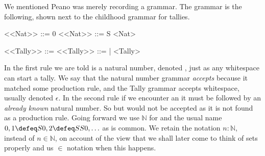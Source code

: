 \index{\code{::=}}
We mentioned Peano was merely recording a grammar.  
The grammar is the following, shown next to the childhood grammar for tallies.
\begin{center}
\begin{minipage}{0.4\textwidth}
\begin{Gcode}[]
<<Nat>> ::= 0 
<<Nat>> ::= S <Nat>
\end{Gcode}
\end{minipage}
\hfill
\begin{minipage}{0.45\textwidth}
\begin{Gcode}[]
<<Tally>> ::=  
<<Tally>> ::= | <Tally>
\end{Gcode}
\end{minipage}
\end{center}
In the first rule we are told  is a natural number, denoted
, just as any whitespace can start a tally. We say that the natural
number grammar \emph{accepts}  because it matched some production rule,
and the Tally grammar accepts whitespace, usually denoted $\epsilon$.  In the
second rule if we encounter an  it must be followed by an \emph{already
known} natural number.  So  but  would not be accepted as
it is not found as a production rule.  Going forward we use $\mathbb{N}$
for  and the usual name $0,1\defeq S0, 2\defeq SS0,\ldots$ as is common.
We retain the notation $n:\mathbb{N}$, instead of $n\in \mathbb{N}$, on account 
of the view that we shall later come to think of sets properly and us $\in$ notation 
when this happens.  





